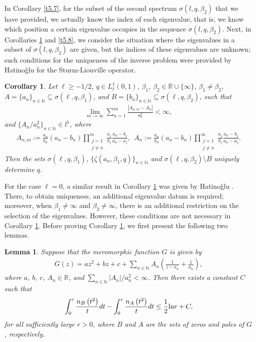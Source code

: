 \documentclass[reqno,12pt,centertags]{amsart}
\renewcommand{\ln}{\text{\rm ln}}
\numberwithin{equation}{section}
\newtheorem{lemma}[theorem]{Lemma}
\newtheorem{corollary}[theorem]{Corollary}
\theoremstyle{definition}
\begin{document}
In Corollary \ref{t5.7}, for the subset of the second spectrum $\sigma(l,q,\beta_2)$ that we have provided, we actually know the index of each eigenvalue, that is, we know which position a certain eigenvalue occupies in the sequence $\sigma(l,q,\beta_2)$. Next, in Corollaries \ref{t5.9} and \ref{t5.8}, we consider the situation where the eigenvalues in a subset of $\sigma(l,q,\beta_2)$ are given, but the indices of these eigenvalues are unknown; such conditions for the uniqueness of the inverse problem were  provided by Hatino\v{g}lu \cite{Hat2021} for the Sturm-Liouville operator.

\begin{corollary}\label{t5.9}
Let $\ell\geq-1/2$, $q\in L_{\ell}^{1}(0,1)$, $\beta_{1}$, $\beta_{2}\in\mathbb{R}\cup\{\infty\}$, $\beta_{1}\neq\beta_{2}$, 
$A=\{a_{n}\}_{n\in\mathbb{N}}\subseteq\sigma(\ell, q, \beta_1)$, and
$B=\{b_{n}\}_{n \in \mathbb{N}}\subseteq\sigma(\ell, q, \beta_2)$, 
such that 
\begin{align*}
\lim_{m \rightarrow \infty}\sum_{n=1}^m\frac{|A_{n, m}-A_{n}|}{ a_{n}^2}<\infty,
\end{align*}
and
$
\{A_{n}/a_{n}^2\}_{n \in \mathbb{N}}\in l^{1}
$,
where
\begin{align*}
A_{n, m}:=\frac{a_n}{b_n}\left(a_n-b_n\right) 
\prod_{\substack{j=1\\j \neq n}}^m \frac{a_j}{b_j} \frac{a_n-b_j}{a_n-a_j},
~~A_n:=\frac{a_n}{b_n}\left(a_n-b_n\right) 
\prod_{\substack{j=1 \\j \neq n}}^{\infty} \frac{a_j}{b_j} \frac{a_n-b_j}{a_n-a_j}.
\end{align*}
Then the sets $\sigma(\ell, q, \beta_1)$, 
$\{\zeta(a_{n},\beta_{1}, q)\}_{n\in \mathbb{N}}$ and 
$\sigma(\ell, q, \beta_2)\setminus B$ uniquely determine $q$.
\end{corollary}

For the case $\ell=0$, a similar result in Corollary \ref{t5.9} was given by Hatino\v{g}lu \cite[Theorems 4.6 and 4.13]{Hat2021}. There, to obtain uniqueness, an additional eigenvalue datum is required; moreover, when $\beta_{1}\neq\infty$ and $\beta_{2}\neq\infty$, there is an additional restriction on the selection of the eigenvalues. However, these conditions are not necessary in Corollary \ref{t5.9}. Before proving Corollary \ref{t5.9}, we first present the following two lemmas.


\begin{lemma}\label{l5.3}
Suppose that the meromorphic function $G$ is given by
\begin{align*}
G(z)=a z^2+b z+c+
\sum_{n\in\mathbb{N}} A_n\left(\frac{1}{z-a_n}+\frac{1}{a_n}\right),
\end{align*}
where $a$, $b$, $c$, $A_{n}\in\mathbb{R}$, and $\sum\limits_{n \in \mathbb{N}}|A_n|/a_n^2<\infty$. Then there exists a constant $C$ such that
\begin{align}\label{e5.16}
\int_0^r \frac{n_B\left(t^2\right)}{t} d t-\int_0^r \frac{n_A\left(t^2\right)}{t}dt \leq \frac{1}{2}\ln r+C,
\end{align}
for all sufficiently large $r>0$, where $B$ and $A$ are the sets of zeros and poles of $G$, respectively.
\end{lemma}
\end{document}
